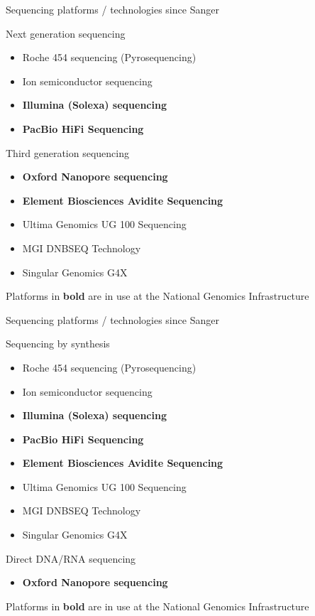 \documentclass[10pt]{beamer}
\newcommand{\credit}[1]{{\vspace{\fill} \par \raggedleft \scriptsize \mdseries \color{mDarkBrown} #1 \par}}
\begin{document}
\begin{frame}{Sequencing platforms / technologies since Sanger}
	\begin{exampleblock}{Next generation sequencing}
		\begin{itemize}
			\item Roche 454 sequencing (Pyrosequencing)
			\item Ion semiconductor sequencing
			\item \textbf{Illumina (Solexa) sequencing}
			\item \textbf{PacBio HiFi Sequencing}
		\end{itemize}
	\end{exampleblock}
	\begin{alertblock}{Third generation sequencing}
		\begin{itemize}
			\item \textbf{Oxford Nanopore sequencing}
			\item \textbf{Element Biosciences Avidite Sequencing}
			\item Ultima Genomics UG 100 Sequencing
			\item MGI DNBSEQ Technology
			\item Singular Genomics G4X
		\end{itemize}
	\end{alertblock}
\credit{Platforms in \textbf{bold} are in use at the National Genomics Infrastructure}
\end{frame}

\begin{frame}{Sequencing platforms / technologies since Sanger}
	\begin{exampleblock}{Sequencing by synthesis}
		\begin{itemize}
			\item Roche 454 sequencing (Pyrosequencing)
			\item Ion semiconductor sequencing
			\item \textbf{Illumina (Solexa) sequencing}
			\item \textbf{PacBio HiFi Sequencing}
			\item \textbf{Element Biosciences Avidite Sequencing}
			\item Ultima Genomics UG 100 Sequencing
			\item MGI DNBSEQ Technology
			\item Singular Genomics G4X
		\end{itemize}
	\end{exampleblock}
	\begin{alertblock}{Direct DNA/RNA sequencing}
		\begin{itemize}
			\item \textbf{Oxford Nanopore sequencing}
		\end{itemize}
	\end{alertblock}
\credit{Platforms in \textbf{bold} are in use at the National Genomics Infrastructure}
\end{frame}
\end{document}
